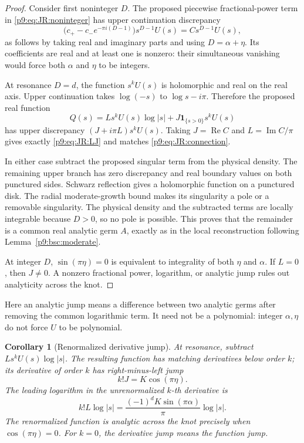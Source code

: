 \documentclass[11pt,a4paper]{article}
\newtheorem{corollary}[theorem]{Corollary}
\theoremstyle{definition}
\theoremstyle{remark}
\numberwithin{equation}{section}
\begin{document}
\begin{proof}
Consider first noninteger \(D\). The proposed piecewise fractional-power
term in \eqref{p9:eq:JR:noninteger} has upper continuation discrepancy
\[
 \bigl(c_+-c_-e^{-\pi i(D-1)}\bigr)s^{D-1}U(s)=Cs^{D-1}U(s),
\]
as follows by taking real and imaginary parts and using
\(D=\alpha+\eta\). Its coefficients are real and at least one is
nonzero: their simultaneous vanishing would force both \(\alpha\)
and \(\eta\) to be integers.

At resonance \(D=d\), the function \(s^kU(s)\) is holomorphic and real
on the real axis. Upper continuation takes
\(\log(-s)\) to \(\log s-i\pi\). Therefore the proposed real function
\[
 Q(s)=L s^kU(s)\log|s|+J\mathbf1_{\{s>0\}}s^kU(s)
\]
has upper discrepancy \((J+i\pi L)s^kU(s)\). Taking
\(J=\operatorname{Re}C\) and \(L=\operatorname{Im}C/\pi\) gives
exactly \eqref{p9:eq:JR:LJ} and matches \eqref{p9:eq:JR:connection}.

In either case subtract the proposed singular term from the physical
density. The remaining upper branch has zero discrepancy and real
boundary values on both punctured sides. Schwarz reflection gives a
holomorphic function on a punctured disk. The radial moderate-growth
bound makes its singularity a pole or a removable singularity. The
physical density and the subtracted terms are locally integrable
because \(D>0\), so no pole is possible. This proves that the remainder
is a common real analytic germ \(A\), exactly as in the local
reconstruction following Lemma~\ref{p9:bsc:moderate}.

At integer \(D\), \(\sin(\pi\eta)=0\) is equivalent to integrality of
both \(\eta\) and \(\alpha\). If \(L=0\), then \(J\ne0\).
A nonzero fractional power, logarithm, or analytic jump rules out
analyticity across the knot.
\end{proof}

Here an analytic jump means a difference between two analytic germs
after removing the common logarithmic term. It need not be a
polynomial: integer \(\alpha,\eta\) do not force \(U\) to be polynomial.

\begin{corollary}[Renormalized derivative jump]\label{p9:cor:JR:jump}
At resonance, subtract \(L s^kU(s)\log|s|\).
The resulting function has matching derivatives below order \(k\);
its derivative of order \(k\) has right-minus-left jump
\[
 k!J=K\cos(\pi\eta).
\]
The leading logarithm in the unrenormalized \(k\)-th derivative is
\[
 k!L\log|s|=\frac{(-1)^dK\sin(\pi\alpha)}{\pi}\log|s|.
\]
The renormalized function is analytic across the knot precisely when
\(\cos(\pi\eta)=0\). For \(k=0\), the derivative jump means the function
jump.
\end{corollary}
\end{document}
